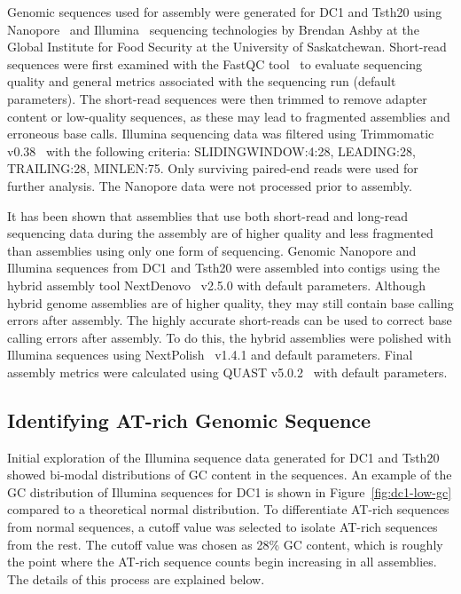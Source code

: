 Genomic sequences used for assembly were generated for DC1 and Tsth20 using Nanopore~\cite{wang2021a} and Illumina~\cite{bennett2004a} sequencing technologies by Brendan Ashby at the Global Institute for Food Security at the University of Saskatchewan. Short-read sequences were first examined with the FastQC tool~\cite{andrews} to evaluate sequencing quality and general metrics associated with the sequencing run (default parameters). The short-read sequences were then trimmed to remove adapter content or low-quality sequences, as these may lead to fragmented assemblies and erroneous base calls. Illumina sequencing data was filtered using Trimmomatic v0.38~\cite{bolger2014a} with the following criteria: SLIDINGWINDOW:4:28, LEADING:28, TRAILING:28, MINLEN:75. Only surviving paired-end reads were used for further analysis. The Nanopore data were not processed prior to assembly.

It has been shown that assemblies that use both short-read and long-read sequencing data during the assembly are of higher quality and less fragmented than assemblies using only one form of sequencing. Genomic Nanopore and Illumina sequences from DC1 and Tsth20 were assembled into contigs using the hybrid assembly tool NextDenovo~\cite{hu2024a} v2.5.0 with default parameters. Although hybrid genome assemblies are of higher quality, they may still contain base calling errors after assembly. The highly accurate short-reads can be used to correct base calling errors after assembly. To do this, the hybrid assemblies were polished with Illumina sequences using NextPolish~\cite{hu2020a} v1.4.1 and default parameters. Final assembly metrics were calculated using QUAST v5.0.2~\cite{gurevich2013a} with default parameters.

\subsection{Identifying AT-rich Genomic Sequence}
\label{met:atrich}
Initial exploration of the Illumina sequence data generated for DC1
and Tsth20 showed bi-modal distributions of GC content in the
sequences. An example of the GC distribution of Illumina sequences for
DC1 is shown in Figure~\ref{fig:dc1-low-gc} compared to a theoretical
normal distribution. To differentiate AT-rich sequences from normal
sequences, a cutoff value was selected to isolate AT-rich sequences
from the rest. The cutoff value was chosen as 28\% GC content, which
is roughly the point where the AT-rich sequence counts begin
increasing in all assemblies. The details of this process are
explained below.

